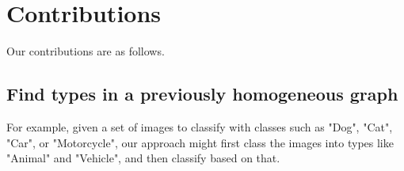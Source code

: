 % 
% 
% 
% 
% 
% 
% 
% 
% 
% 


\section{Contributions}

Our contributions are as follows.

\subsection{Find types in a previously homogeneous graph} 
For example, given a set of images to classify with classes such as "Dog", "Cat", "Car", or "Motorcycle",
our approach might first class the images into types like "Animal" and "Vehicle", and then classify based on that.

